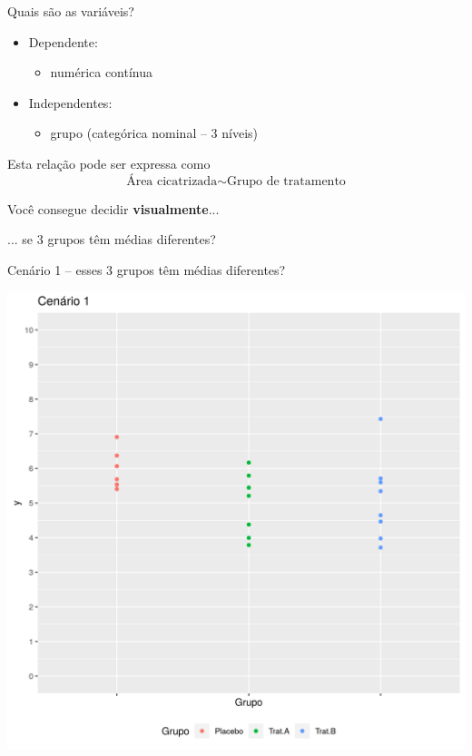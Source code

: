 \documentclass{beamer}
\begin{document}
\begin{frame}{\scriptsize Quais são as variáveis?}
  \begin{itemize}
    \footnotesize
  \item Dependente:
    \begin{itemize}
      \scriptsize
    \item numérica contínua
    \end{itemize}
  \item Independentes:
    \begin{itemize}
      \scriptsize
    \item grupo (categórica nominal -- 3 níveis)
    \end{itemize}
  \end{itemize}
  \vfill
  \begin{block}{Esta relação pode ser expressa como}
    \begin{displaymath}
      \text{Área cicatrizada} \sim \text{Grupo de tratamento}
    \end{displaymath}
  \end{block}
\end{frame}

\begin{frame}[label=ident-visual]{\scriptsize }
  \begin{center}
    \large
    Você consegue decidir {\bf visualmente}...

    \bigskip
    ... se 3 grupos têm médias diferentes?
  \end{center}
\end{frame}

\begin{frame}[label=cenario1]{\scriptsize Cenário 1 -- esses 3 grupos têm médias diferentes?}
  \begin{center}
    \includegraphics[height=.9\textheight]{Cap13-30/cenario11}
  \end{center}
\end{frame}
\end{document}
